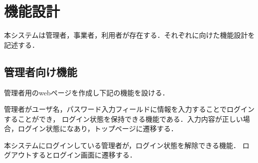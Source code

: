 \documentclass[a4paper, titlepage]{jsarticle}
\begin{document}
\section{機能設計}
本システムは管理者，事業者，利用者が存在する．それぞれに向けた機能設計を記述する．
\subsection{管理者向け機能}
管理者用のwebページを作成し下記の機能を設ける．
\begin{description}[labelwidth=\linewidth]
  \setlength{\leftskip}{1em}

  \item [ログイン機能] 管理者がユーザ名，パスワード入力フィールドに情報を入力することでログインすることができ，
  ログイン状態を保持できる機能である．入力内容が正しい場合，ログイン状態になあり，トップページに遷移する．
  \item [ログアウト機能] 本システムにログインしている管理者が，ログイン状態を解除できる機能．
  ログアウトするとログイン画面に遷移する．




\end{description}
\end{document}
